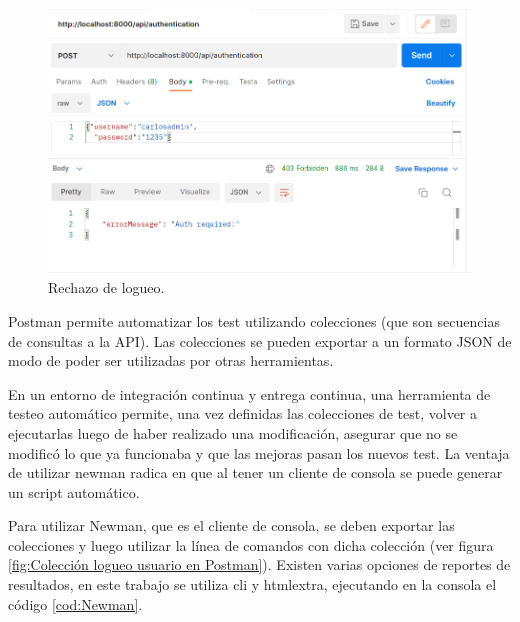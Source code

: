 \begin{figure}[ht]
	\centering
	\includegraphics[scale=.35]{./Figures/no-auth.png}
	\caption{Rechazo de logueo.}
	\label{fig:Rechazo Logueo en el sistema con Postman}
\end{figure}

Postman permite automatizar los test utilizando colecciones (que son secuencias de consultas a la API). Las colecciones se pueden exportar a un formato JSON de modo de poder ser utilizadas por otras herramientas. 

En un entorno de integración continua y entrega continua, una herramienta de testeo automático permite, una vez definidas las colecciones de test, volver a ejecutarlas luego de haber realizado una modificación,  asegurar que no se modificó lo que ya funcionaba y que las mejoras pasan los nuevos test. La ventaja de utilizar newman radica en que al tener un cliente de consola se puede generar un script automático.

Para utilizar Newman, que es el cliente de consola, se deben exportar las colecciones y luego utilizar la línea de comandos con dicha colección (ver figura \ref{fig:Colección logueo usuario en Postman}). Existen varias opciones de reportes de resultados, en este trabajo se utiliza cli y htmlextra, ejecutando en la consola el código \ref{cod:Newman}.

